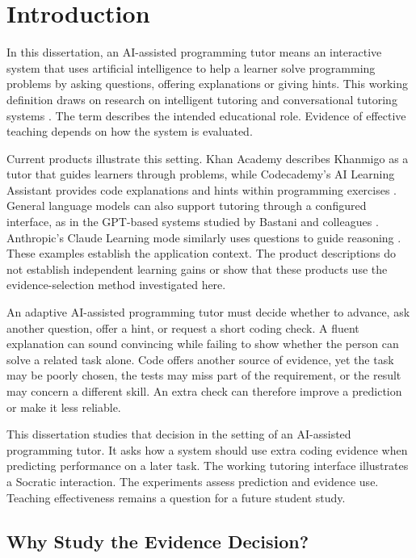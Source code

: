 \chapter{Introduction}
\label{ch:introduction}

In this dissertation, an AI-assisted programming tutor means an interactive system that uses artificial intelligence to help a learner
solve programming problems by asking questions, offering explanations or giving hints. This working definition draws on research on
intelligent tutoring and conversational tutoring systems \parencite{vanlehn2011relative,nye2014autotutor}. The term describes
the intended educational role. Evidence of effective teaching depends on how the system is evaluated.

Current products illustrate this setting. Khan Academy describes Khanmigo as a tutor that guides learners through problems,
while Codecademy's AI Learning Assistant provides code explanations and hints within programming exercises
\parencite{khanacademyKhanmigo,codecademyLearningAssistant}. General language models can also support tutoring through a
configured interface, as in the GPT-based systems studied by Bastani and colleagues \parencite{bastani2025guardrails}.
Anthropic's Claude Learning mode similarly uses questions to guide reasoning \parencite{anthropic2025education}.
These examples establish the application context. The product descriptions do not establish independent learning gains or
show that these products use the evidence-selection method investigated here.

An adaptive AI-assisted programming tutor must decide whether to advance, ask another question, offer a hint, or request a short coding
check. A fluent explanation can sound convincing while failing to show whether the person can solve a related task alone.
Code offers another source of evidence, yet the task may be poorly chosen, the tests may miss part of the requirement, or the
result may concern a different skill. An extra check can therefore improve a prediction or make it less reliable.

This dissertation studies that decision in the setting of an AI-assisted programming tutor. It asks how a system should use extra coding
evidence when predicting performance on a later task. The working tutoring interface illustrates a Socratic interaction.
The experiments assess prediction and evidence use. Teaching effectiveness remains a question for a future student study.

\section{Why Study the Evidence Decision?}

